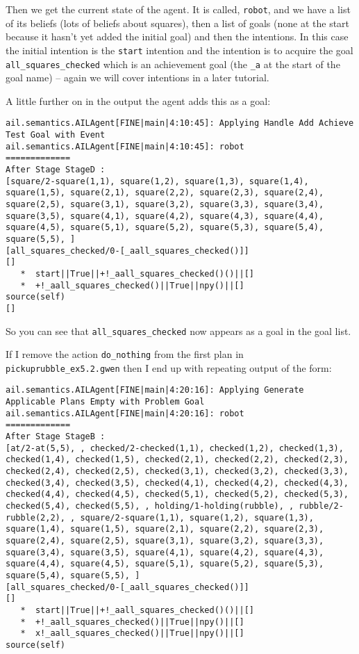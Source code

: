 \documentclass[a4]{article}
\begin{document}
Then we get the current state of the agent.  It is called, \texttt{robot}, and we have a list of its beliefs (lots of beliefs about squares), then a list of goals (none at the start because it hasn't yet added the initial goal) and then the intentions.  In this case the initial intention is the \texttt{start} intention and the intention is to acquire the goal \texttt{all\_squares\_checked} which is an achievement goal (the \texttt{\_a} at the start of the goal name) -- again we will cover intentions in a later tutorial.

A little further on in the output the agent adds this as a goal:
\begin{verbatim}
ail.semantics.AILAgent[FINE|main|4:10:45]: Applying Handle Add Achieve Test Goal with Event 
ail.semantics.AILAgent[FINE|main|4:10:45]: robot
=============
After Stage StageD :
[square/2-square(1,1), square(1,2), square(1,3), square(1,4), square(1,5), square(2,1), square(2,2), square(2,3), square(2,4), square(2,5), square(3,1), square(3,2), square(3,3), square(3,4), square(3,5), square(4,1), square(4,2), square(4,3), square(4,4), square(4,5), square(5,1), square(5,2), square(5,3), square(5,4), square(5,5), ]
[all_squares_checked/0-[_aall_squares_checked()]]
[]
   *  start||True||+!_aall_squares_checked()()||[]
   *  +!_aall_squares_checked()||True||npy()||[]
source(self)
[] 
\end{verbatim}
So you can see that \texttt{all\_squares\_checked} now appears as a goal in the goal list. 

If I remove the action \texttt{do\_nothing} from the first plan in \texttt{pickuprubble\_ex5.2.gwen} then I end up with repeating output of the form:

\begin{verbatim}
ail.semantics.AILAgent[FINE|main|4:20:16]: Applying Generate Applicable Plans Empty with Problem Goal 
ail.semantics.AILAgent[FINE|main|4:20:16]: robot
=============
After Stage StageB :
[at/2-at(5,5), , checked/2-checked(1,1), checked(1,2), checked(1,3), checked(1,4), checked(1,5), checked(2,1), checked(2,2), checked(2,3), checked(2,4), checked(2,5), checked(3,1), checked(3,2), checked(3,3), checked(3,4), checked(3,5), checked(4,1), checked(4,2), checked(4,3), checked(4,4), checked(4,5), checked(5,1), checked(5,2), checked(5,3), checked(5,4), checked(5,5), , holding/1-holding(rubble), , rubble/2-rubble(2,2), , square/2-square(1,1), square(1,2), square(1,3), square(1,4), square(1,5), square(2,1), square(2,2), square(2,3), square(2,4), square(2,5), square(3,1), square(3,2), square(3,3), square(3,4), square(3,5), square(4,1), square(4,2), square(4,3), square(4,4), square(4,5), square(5,1), square(5,2), square(5,3), square(5,4), square(5,5), ]
[all_squares_checked/0-[_aall_squares_checked()]]
[]
   *  start||True||+!_aall_squares_checked()()||[]
   *  +!_aall_squares_checked()||True||npy()||[]
   *  x!_aall_squares_checked()||True||npy()||[]
source(self)
\end{verbatim}
\end{document}
